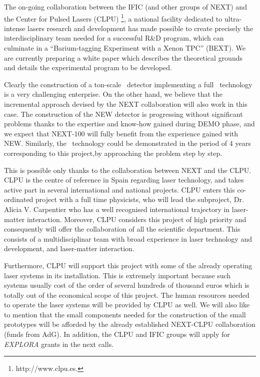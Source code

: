 \documentclass[a4paper,11pt,oneside]{article}
\begin{document}
The on-going collaboration between the IFIC (and other groups of NEXT) and the Center for Pulsed Lasers (CLPU) \footnote{http://www.clpu.es.}, a national facility dedicated to ultra-intense lasers research and development has made possible to create precisely the interdisciplinary team needed for a successful R\&D program, which can culminate in a ``Barium-tagging Experiment with a Xenon TPC'' (BEXT). We are currently preparing a white paper which describes the theoretical grounds and details the experimental program to be developed. 

Clearly the construction of a ton-scale \HPXE\ detector implementing a full \BATA\ technology is a very challenging enterprise. On the other hand, we believe that the incremental approach devised by the NEXT collaboration will also work in this case. The construction of the NEW detector is progressing without significant problems thanks to the expertise and know-how gained during DEMO phase, and we expect that NEXT-100 will fully benefit from the experience gained with NEW. Similarly, the \BATA\ technology could be demonstrated in the period of 4 years corresponding to this project,by approaching the problem step by step. 

This is possible only thanks to the collaboration between NEXT and the CLPU.
CLPU is the centre of reference in Spain regarding laser technology, and takes active part in several international and national projects. CLPU enters this co-ordinated project with a full time physicists, who will lead the subproject, Dr. Alicia V. Carpentier who has a well recognised international trajectory in laser-matter interaction. Moreover, CLPU considers this project of high priority and consequently will offer the collaboration of all the scientific department. This consists of a multidisciplinar team with broad experience in laser technology and development, and laser-matter interaction. 

Furthermore, CLPU will support this project with some of the already operating laser systems in its installation. This is extremely important because such systems usually cost of the order of several hundreds of thousand euros which is totally out of the economical scope of this project. The human resources needed to operate the laser systems will be provided by CLPU as well. We will  also like to mention that the small components needed for the construction of the small prototypes will be afforded by the already established NEXT-CLPU collaboration (funds from AdG). In addition, the CLPU and IFIC groups will apply for  \emph{EXPLORA} grants in the next calls.
\end{document}
